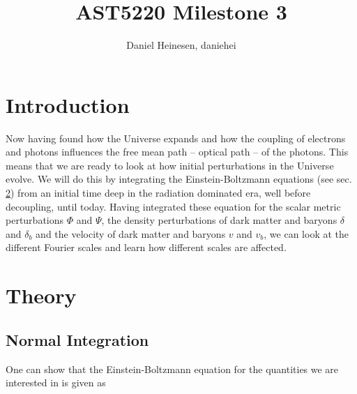 \documentclass[a4paper,norsk, 10pt]{article}
\title{AST5220 Milestone 3}
\author{Daniel Heinesen, daniehei}
\begin{document}
\maketitle

\section{Introduction}
Now having found  how the Universe expands and how the coupling of electrons and photons influences the free mean path -- optical path -- of the photons. This means that we are ready to look at how initial perturbations in the Universe evolve. We will do this by integrating the Einstein-Boltzmann equations (see sec. \ref{sec:theory}) from an initial time deep in the radiation dominated era, well before decoupling, until today. Having integrated these equation for the scalar metric perturbations $\Phi$ and $\Psi$, the density perturbations of dark matter and baryons $\delta$ and $\delta_b$ and the velocity of dark matter and baryons $v$ and $v_b$, we can look at the different Fourier scales and learn how different scales are affected.

\section{Theory}\label{sec:theory}

\subsection{Normal Integration}\label{sec:normal}
One can show that the Einstein-Boltzmann equation for the quantities we are interested in is given as
\end{document}
